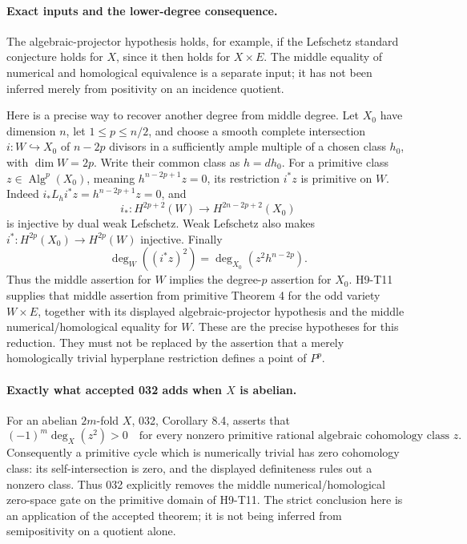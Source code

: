 \documentclass[11pt,a4paper]{article}
\begin{document}
\paragraph{Exact inputs and the lower-degree consequence.}
The algebraic-projector hypothesis holds, for example, if the
Lefschetz standard conjecture holds for $X$, since it then holds for
$X\times E$. The middle equality of numerical and homological
equivalence is a separate input; it has not been inferred merely from
positivity on an incidence quotient.

Here is a precise way to recover another degree from middle degree.
Let $X_0$ have dimension $n$, let $1\le p\le n/2$, and choose a smooth
complete intersection $i:W\hookrightarrow X_0$ of $n-2p$ divisors
in a sufficiently ample multiple of a chosen class $h_0$, with
$\dim W=2p$. Write their common class as $h=d h_0$.
For a primitive class $z\in\operatorname{Alg}^p(X_0)$, meaning
$h^{n-2p+1}z=0$, its restriction $i^*z$ is primitive on $W$.
Indeed $i_*L_h i^*z=h^{n-2p+1}z=0$, and
\[
 i_*:H^{2p+2}(W)\longrightarrow H^{2n-2p+2}(X_0)
\]
is injective by dual weak Lefschetz. Weak Lefschetz also makes
$i^*:H^{2p}(X_0)\to H^{2p}(W)$ injective. Finally
\[
 \deg_W((i^*z)^2)=\deg_{X_0}(z^2h^{n-2p}).
\]
Thus the middle assertion for $W$ implies the degree-$p$ assertion
for $X_0$. H9-T11 supplies that middle assertion from primitive
Theorem 4 for the odd variety $W\times E$, together with its displayed
algebraic-projector hypothesis and the middle numerical/homological
equality for $W$. These are the precise hypotheses for this reduction.
They must not be replaced by the assertion that a merely homologically
trivial hyperplane restriction defines a point of $P^p$.

\paragraph{Exactly what accepted 032 adds when $X$ is abelian.}
For an abelian $2m$-fold $X$, 032, Corollary 8.4, asserts that
\[
 (-1)^m\deg_X(z^2)>0
 \quad\text{for every nonzero primitive rational algebraic
 cohomology class }z.
\]
Consequently a primitive cycle which is numerically trivial has zero
cohomology class: its self-intersection is zero, and the displayed
definiteness rules out a nonzero class. Thus 032 explicitly removes
the middle numerical/homological zero-space gate on the primitive
domain of H9-T11. The strict conclusion here is an application of
the accepted theorem; it is not being inferred from semipositivity
on a quotient alone.
\end{document}
